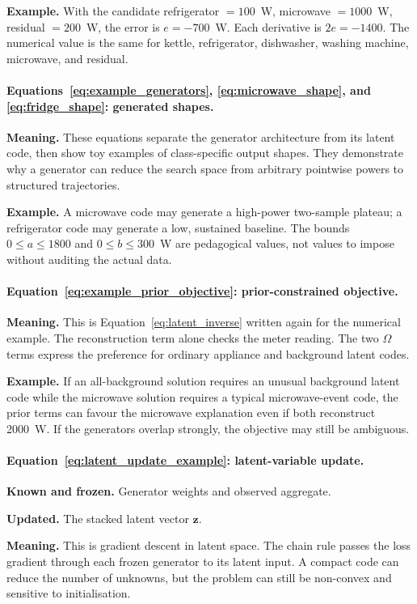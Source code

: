 \documentclass[11pt]{article}
\newcommand{\vect}[1]{\mathbf{#1}}
\begin{document}
\textbf{Example.} With the candidate refrigerator $=100$~W, microwave $=1000$~W, residual $=200$~W, the error is $e=-700$~W. Each derivative is $2e=-1400$. The numerical value is the same for kettle, refrigerator, dishwasher, washing machine, microwave, and residual.

\paragraph{Equations~\eqref{eq:example_generators}, \eqref{eq:microwave_shape}, and \eqref{eq:fridge_shape}: generated shapes.}
\textbf{Meaning.} These equations separate the generator architecture from its latent code, then show toy examples of class-specific output shapes. They demonstrate why a generator can reduce the search space from arbitrary pointwise powers to structured trajectories.

\textbf{Example.} A microwave code may generate a high-power two-sample plateau; a refrigerator code may generate a low, sustained baseline. The bounds $0\leq a\leq1800$ and $0\leq b\leq300$~W are pedagogical values, not values to impose without auditing the actual data.

\paragraph{Equation~\eqref{eq:example_prior_objective}: prior-constrained objective.}
\textbf{Meaning.} This is Equation~\eqref{eq:latent_inverse} written again for the numerical example. The reconstruction term alone checks the meter reading. The two $\Omega$ terms express the preference for ordinary appliance and background latent codes.

\textbf{Example.} If an all-background solution requires an unusual background latent code while the microwave solution requires a typical microwave-event code, the prior terms can favour the microwave explanation even if both reconstruct 2000~W. If the generators overlap strongly, the objective may still be ambiguous.

\paragraph{Equation~\eqref{eq:latent_update_example}: latent-variable update.}
\textbf{Known and frozen.} Generator weights and observed aggregate.

\textbf{Updated.} The stacked latent vector $\vect{z}$.

\textbf{Meaning.} This is gradient descent in latent space. The chain rule passes the loss gradient through each frozen generator to its latent input. A compact code can reduce the number of unknowns, but the problem can still be non-convex and sensitive to initialisation.
\end{document}
